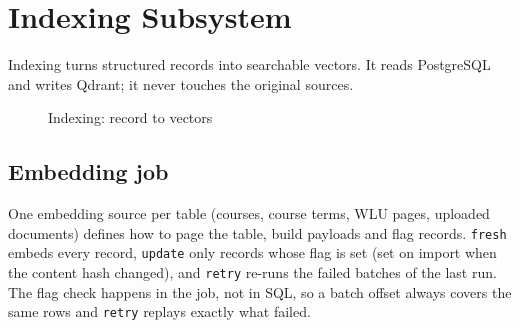 \documentclass[11pt,letterpaper]{report}
\begin{document}
\chapter{Indexing Subsystem}\label{ch:indexing}
Indexing turns structured records into searchable vectors. It reads PostgreSQL and writes Qdrant;
it never touches the original sources.

\begin{figure}[H]
\centering
{}
\caption{Indexing: record to vectors}\label{fig:indexing}
\end{figure}

\section{Embedding job}
One embedding source per table (courses, course terms, WLU pages, uploaded documents) defines how to
page the table, build payloads and flag records. \texttt{fresh} embeds every record, \texttt{update}
only records whose  flag is set (set on import when the content hash changed),
and \texttt{retry} re-runs the failed batches of the last run. The flag check happens in the job, not
in SQL, so a batch offset always covers the same rows and \texttt{retry} replays exactly what failed.
\end{document}
